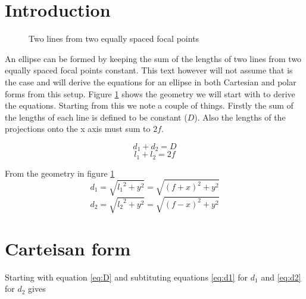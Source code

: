 \documentclass[a5paper,12pt]{article}
\begin{document}

\clearpage
\tableofcontents
\listoftables
\listoffigures
\clearpage

\section{Introduction}
\begin{figure}[h]
  \centering
 
\caption{Two lines from two equally spaced focal points} \label{fig:Setup}
\end{figure}

An ellipse can be formed by keeping the sum of the lengths of two lines from two equally spaced focal points constant. This text however will not assume that is the case and will derive the equations for an ellipse in both Cartesian and polar forms from this setup. Figure \ref{fig:Setup} shows the geometry we will start with to derive the equations.
Starting from this we note a couple of things. Firstly the sum of the lengths of each line is defined to be constant ($D$). Also the lengths of the projections onto the x axis must sum to $2f$.
\begin{framed}
\begin{equation}\label{eq:D}
d_1+d_2=D
\end{equation}
\begin{equation}\label{eq:f}
l_1+l_2=2f
\end{equation}
\end{framed}

From the geometry in figure \ref{fig:Setup}
\begin{equation}\label{eq:d1}
d_1=\sqrt{{l_1}^2+y^2}=\sqrt{(f+x)^2+y^2}
\end{equation}
\begin{equation}\label{eq:d2}
d_2=\sqrt{{l_2}^2+y^2}=\sqrt{(f-x)^2+y^2}
\end{equation}

\section{Carteisan form}

Starting with equation \ref{eq:D} and subtituting equations \ref{eq:d1} for $d_1$ and \ref{eq:d2} for $d_2$ gives
\end{document}
